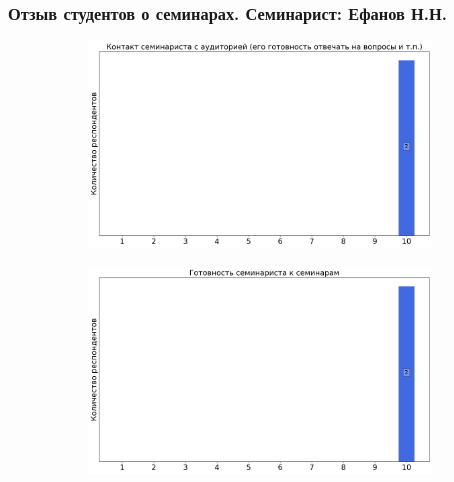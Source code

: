     \subsubsection{Отзыв студентов о семинарах. Семинарист: Ефанов Н.Н.}
        \begin{figure}[H]
            \centering
            \begin{subfigure}[b]{0.45\textwidth}
                \centering
                \includegraphics[width=\textwidth]{images/2 course/Компьютерные технологии/seminarists-marks-Ефанов Н.Н.-0.png}
            \end{subfigure}
            \begin{subfigure}[b]{0.45\textwidth}
                \centering
                \includegraphics[width=\textwidth]{images/2 course/Компьютерные технологии/seminarists-marks-Ефанов Н.Н.-1.png}
            \end{subfigure}
            \begin{subfigure}[b]{0.45\textwidth}
                \centering

\end{subfigure}
\end{figure}

